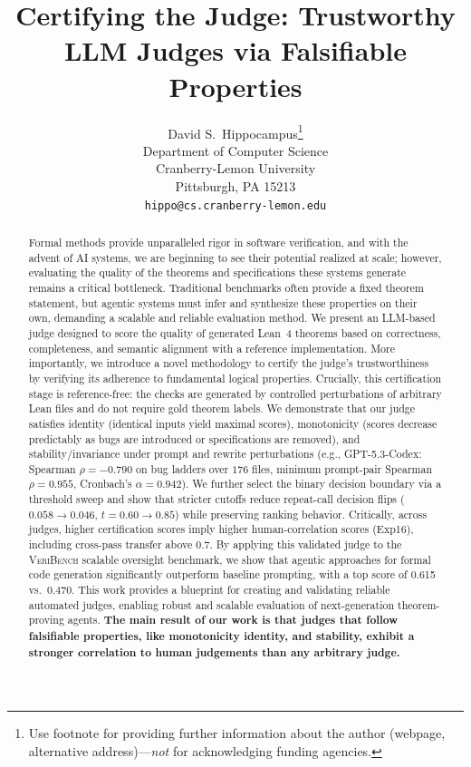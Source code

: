 \documentclass[numbers]{article}
\title{Certifying the Judge: Trustworthy LLM Judges via
Falsifiable Properties}
\author{%
  David S.~Hippocampus\thanks{Use footnote for providing further information
    about the author (webpage, alternative address)---\emph{not} for acknowledging
    funding agencies.} \\
  Department of Computer Science\\
  Cranberry-Lemon University\\
  Pittsburgh, PA 15213 \\
  \texttt{hippo@cs.cranberry-lemon.edu} \\
}
\begin{document}
\raggedbottom

\maketitle

\begin{abstract}
  Formal methods provide unparalleled rigor in software verification, and with the advent of AI systems, we are beginning to see their potential realized at scale; however, evaluating the quality of the theorems and specifications these systems generate remains a critical bottleneck.
  Traditional benchmarks often provide a fixed theorem statement, but agentic systems must infer and synthesize these properties on their own, demanding a scalable and reliable evaluation method.
  We present an LLM-based judge designed to score the quality of generated Lean~4 theorems based on correctness, completeness, and semantic alignment with a reference implementation.
  More importantly, we introduce a novel methodology to certify the judge's trustworthiness by verifying its adherence to fundamental logical properties.
  Crucially, this certification stage is reference-free: the checks are generated by controlled perturbations of arbitrary Lean files and do not require gold theorem labels.
  We demonstrate that our judge satisfies identity (identical inputs yield maximal scores), monotonicity (scores decrease predictably as bugs are introduced or specifications are removed), and stability/invariance under prompt and rewrite perturbations (e.g., GPT-5.3-Codex: Spearman \(\rho=-0.790\) on bug ladders over \(176\) files, minimum prompt-pair Spearman \(\rho=0.955\), Cronbach's \(\alpha=0.942\)).
  We further select the binary decision boundary via a threshold sweep and show that stricter cutoffs reduce repeat-call decision flips (\(0.058 \rightarrow 0.046\), \(t=0.60\rightarrow0.85\)) while preserving ranking behavior.
  Critically, across judges, higher certification scores imply higher human-correlation scores (Exp16), including cross-pass transfer above \(0.7\).
  By applying this validated judge to the \textsc{VeriBench}\citep{veribench_icml25} scalable oversight benchmark, we show that agentic approaches for formal code generation significantly outperform baseline prompting, with a top score of 0.615 vs.\ 0.470.
  This work provides a blueprint for creating and validating reliable automated judges, enabling robust and scalable evaluation of next-generation theorem-proving agents. \textbf{The main result of our work is that judges that follow falsifiable properties, like monotonicity identity, and stability, exhibit a stronger correlation to human judgements than any arbitrary judge.}
\end{abstract}
\end{document}
